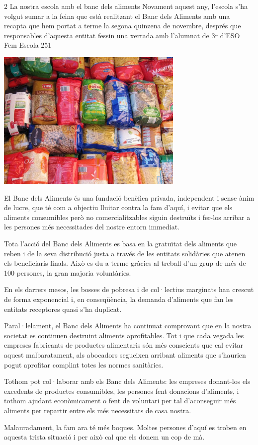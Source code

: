\begin{news}
{2} %
{La nostra escola amb el banc dels aliments}
{Novament aquest any, l’escola s’ha volgut sumar a la feina que està realitzant el Banc dels Aliments amb una recapta que hem portat a terme la segona quinzena de novembre, després que responsables d’aquesta entitat fessin una xerrada amb l’alumnat de 3r d’ESO}
{Fem Escola}
{251} %

\noindent\includegraphics[width=9cm,keepaspectratio]{fem_escola/img/aliments.jpg}

El Banc dels Aliments és una fundació benèfica privada, independent i sense ànim de lucre, que té com a objectiu lluitar contra la fam d’aquí, i evitar que els aliments consumibles però no comercialitzables siguin destruïts i fer-los arribar a les persones més necessitades del nostre entorn immediat.

Tota l’acció del Banc dels Aliments es basa en la gratuïtat dels aliments que reben i de la seva distribució justa a través de les entitats solidàries que atenen els beneficiaris finals. Això es du a terme gràcies al treball d’un grup de més de 100 persones, la gran majoria voluntàries.

En els darrers mesos, les bosses de pobresa i de col·lectius marginats han crescut de forma exponencial i, en conseqüència, la demanda d’aliments que fan les entitats receptores quasi s'ha duplicat.

Paral·lelament, el Banc dels Aliments ha continuat comprovant que en la nostra societat es continuen destruint aliments aprofitables. Tot i que cada vegada les empreses fabricants de productes alimentaris són més conscients que cal evitar aquest malbaratament, als abocadors segueixen arribant aliments que s’haurien pogut aprofitar complint totes les normes sanitàries.

Tothom pot col·laborar amb els Banc dels Aliments: les empreses donant-los els excedents de productes consumibles, les persones fent donacions d’aliments, i tothom ajudant econòmicament o fent de voluntari per tal d'aconseguir més aliments per repartir entre els més necessitats de casa nostra.

Malauradament, la fam ara té més boques. Moltes persones d’aquí es troben en aquesta trista situació i per això cal que els donem un cop de mà.

\end{news}
